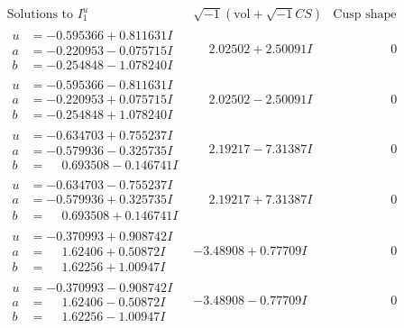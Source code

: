 \documentclass[1p]{elsarticle_modified}
\theoremstyle{definition}
\newcommand{\I}{\sqrt{-1}}
\begin{document}
$$\begin{array}{c|c|c}  
\text{Solutions to }I^u_{1}& \I (\text{vol} + \sqrt{-1}CS) & \text{Cusp shape}\\
 \hline 
\begin{aligned}
u &= -0.595366 + 0.811631 I \\
a &= -0.220953 - 0.075715 I \\
b &= -0.254848 - 1.078240 I\end{aligned}
 & \phantom{-}2.02502 + 2.50091 I & \phantom{-0.000000 } 0 \\ \hline\begin{aligned}
u &= -0.595366 - 0.811631 I \\
a &= -0.220953 + 0.075715 I \\
b &= -0.254848 + 1.078240 I\end{aligned}
 & \phantom{-}2.02502 - 2.50091 I & \phantom{-0.000000 } 0 \\ \hline\begin{aligned}
u &= -0.634703 + 0.755237 I \\
a &= -0.579936 - 0.325735 I \\
b &= \phantom{-}0.693508 - 0.146741 I\end{aligned}
 & \phantom{-}2.19217 - 7.31387 I & \phantom{-0.000000 } 0 \\ \hline\begin{aligned}
u &= -0.634703 - 0.755237 I \\
a &= -0.579936 + 0.325735 I \\
b &= \phantom{-}0.693508 + 0.146741 I\end{aligned}
 & \phantom{-}2.19217 + 7.31387 I & \phantom{-0.000000 } 0 \\ \hline\begin{aligned}
u &= -0.370993 + 0.908742 I \\
a &= \phantom{-}1.62406 + 0.50872 I \\
b &= \phantom{-}1.62256 + 1.00947 I\end{aligned}
 & -3.48908 + 0.77709 I & \phantom{-0.000000 } 0 \\ \hline\begin{aligned}
u &= -0.370993 - 0.908742 I \\
a &= \phantom{-}1.62406 - 0.50872 I \\
b &= \phantom{-}1.62256 - 1.00947 I\end{aligned}
 & -3.48908 - 0.77709 I & \phantom{-0.000000 } 0 \\ \hline\begin{aligned}

\end{aligned}
\end{array}$$
\end{document}
